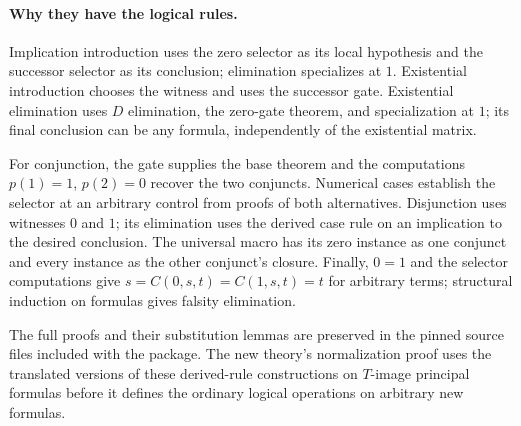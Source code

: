 \paragraph{Why they have the logical rules.}
Implication introduction uses the zero selector as its local hypothesis
and the successor selector as its conclusion; elimination specializes
at $1$. Existential introduction chooses the witness and uses the
successor gate. Existential elimination uses $D$ elimination, the
zero-gate theorem, and specialization at $1$; its final conclusion can
be any formula, independently of the existential matrix.

For conjunction, the gate supplies the base theorem and the computations
$p(1)=1$, $p(2)=0$ recover the two conjuncts. Numerical cases establish
the selector at an arbitrary control from proofs of both alternatives.
Disjunction uses witnesses $0$ and $1$; its elimination uses the derived
case rule on an implication to the desired conclusion. The universal
macro has its zero instance as one conjunct and every instance as the
other conjunct's closure. Finally, $0=1$ and the selector computations
give $s=C(0,s,t)=C(1,s,t)=t$ for arbitrary terms; structural induction
on formulas gives falsity elimination.

The full proofs and their substitution lemmas are preserved in the
pinned source files included with the package. The new theory's
normalization proof uses the translated versions of these derived-rule
constructions on $T$-image principal formulas before it defines the
ordinary logical operations on arbitrary new formulas.
